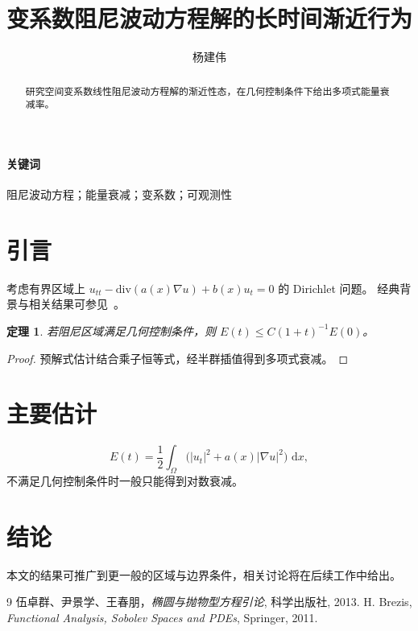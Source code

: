 \documentclass[UTF8,fontset=fandol,11pt]{ctexart}
\title{变系数阻尼波动方程解的长时间渐近行为}
\author{杨建伟}
\date{}
\newtheorem{theorem}{定理}[section]
\newcommand{\Om}{\Omega}
\newcommand{\dd}{\,\mathrm{d}}
\begin{document}
\maketitle
\begin{abstract}
研究空间变系数线性阻尼波动方程解的渐近性态，在几何控制条件下给出多项式能量衰减率。
\end{abstract}
\paragraph{关键词} 阻尼波动方程；能量衰减；变系数；可观测性

\section{引言}
考虑有界区域上 $u_{tt}-\mathrm{div}(a(x)\nabla u)+b(x)u_t=0$ 的 Dirichlet 问题。
经典背景与相关结果可参见~\cite{Evans,Brezis}。

\begin{theorem}
若阻尼区域满足几何控制条件，则 $E(t)\le C(1+t)^{-1}E(0)$。
\end{theorem}

\begin{proof}
预解式估计结合乘子恒等式，经半群插值得到多项式衰减。
\end{proof}

\section{主要估计}
\begin{equation}
E(t)=\frac12\int_\Om\bigl(|u_t|^2+a(x)|\nabla u|^2\bigr)\,\dd x,
\end{equation}
不满足几何控制条件时一般只能得到对数衰减。

\section{结论}
本文的结果可推广到更一般的区域与边界条件，相关讨论将在后续工作中给出。

\begin{thebibliography}{9}
 伍卓群、尹景学、王春朋，\emph{椭圆与抛物型方程引论}, 科学出版社, 2013.
 H. Brezis, \emph{Functional Analysis, Sobolev Spaces and PDEs}, Springer, 2011.
\end{thebibliography}
\end{document}
